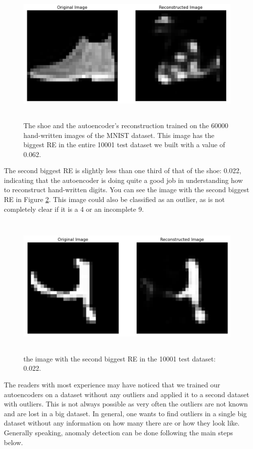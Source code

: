 \documentclass[12pt,a4]{article}
\begin{document}
\begin{figure}[hbt]
\centering
\includegraphics[width=12.61cm,height=7.02cm]{./images/image12.png}
\caption{The shoe and the autoencoder's reconstruction trained on the 60000 hand-written images of the MNIST dataset. This image has the biggest RE in the entire 10001 test dataset we built with a value of 0.062.}\label{fig:recon2}
\end{figure}
The second biggest RE is slightly less than one third of that of the shoe: 0.022, indicating that the autoencoder is doing quite a good job in understanding how to reconstruct hand-written digits. You can see the image with the second biggest RE in Figure \ref{fig:recon3}. This image could also be classified as an outlier, as is not completely clear if it is a 4 or an incomplete 9.
\begin{figure}[hbt]
\centering
\includegraphics[width=12.61cm,height=7.09cm]{./images/image13.png}
\caption{the image with the second biggest RE in the 10001 test dataset: 0.022.}\label{fig:recon3}
\end{figure}
The readers with most experience may have noticed that we trained our autoencoders on a dataset without any outliers and applied it to a second dataset with outliers. This is not always possible as very often the outliers are not known and are lost in a big dataset. In general, one wants to find outliers in a single big dataset without any information on how many there are or how they look like. Generally speaking, anomaly detection can be done following the main steps below.
\end{document}
